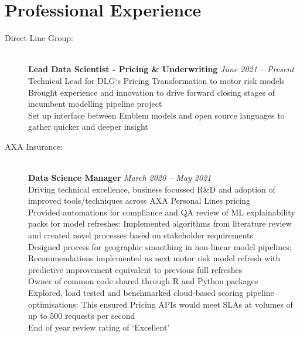 \documentclass[11pt]{article}
\begin{document}
\section*{Professional Experience}
\begin{description}

\item[Direct Line Group:] \hspace{1mm}\\
\textbf{Lead Data Scientist - Pricing \& Underwriting} \emph{June 2021 -- Present} \\
\textbullet \quad Technical Lead for DLG`s Pricing Transformation to motor risk models\\
\textbullet \quad Brought experience and innovation to drive forward closing stages of incumbent modelling pipeline project\\
\textbullet \quad Set up interface between Emblem models and open source languages to gather quicker and deeper insight

\item[AXA Insurance:] \hspace{1mm} \\
\textbf{Data Science Manager} \emph{March 2020 -- May 2021}\\
\textbullet \quad Driving technical excellence, business focussed R\&D and adoption of improved tools/techniques across AXA Personal Lines pricing \\
\textbullet \quad Provided automations for compliance and QA review of ML explainability packs for model refreshes: Implemented algorithms from literature review and created novel processes based on stakeholder requirements \\
\textbullet \quad Designed process for geographic smoothing in non-linear model pipelines: Recommendations implemented as next motor risk model refresh with predictive improvement equivalent to previous full refreshes\\
\textbullet \quad Owner of common code shared through R and Python packages \\
\textbullet \quad Explored, load tested and benchmarked cloud-based scoring pipeline optimisations: This ensured Pricing APIs would meet SLAs at volumes of up to 500 requests per second \\
\textbullet \quad End of year review rating of `Excellent'


\end{description}
\end{document}
